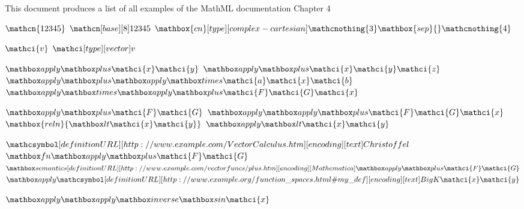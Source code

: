 \documentclass{article}
\begin{document}
This document produces a list of all examples of the MathML documentation
Chapter 4 

\newcommand\www{http://www.example.com}
\newcommand\openmath{http://www.openmath.org/cd}

\newcommand\Power[2]{\mmlapply{\mmlPower#1#2}}
\newcommand\Sum[2]{\mmlapply{\mmlPlus#1#2}}
\newcommand\Product[2]{\mmlapply{\mmlTimes#1#2}}
\newcommand\Lt[2]{\mmlapply{\mmlLt#1#2}}
\newcommand\Fn[1]{\mmlfn{\mathci{#1}}}
\newcommand\Set[1]{\mathci\mmlAtype{set}{#1}}
\newcommand\List[1]{\mathci\mmlAtype{list}{#1}}
\newcommand\Vector[1]{\mathci\mmlAtype{vector}{#1}}

\newcommand\exprA{\Sum{\mathci{F}}{\mathci{G}}}
\newcommand\Condition[1]{\mmlcondition{\mmlapply{#1}}}


\newcommand\cix{\mathci{x}}
\newcommand\ciy{\mathci{y}}
\newcommand\ciz{\mathci{z}}
\newcommand\cit{\mathci{t}}
\newcommand\ciu{\mathci{u}}

\newcommand\cia{\mathci{a}}
\newcommand\cib{\mathci{b}}
\newcommand\ciA{\mathci{A}}
\newcommand\ciB{\mathci{B}}
\newcommand\cic{\mathci{c}}
\newcommand\cif{\mathci{f}}
\newcommand\cin{\mathci{n}}
\newcommand\ciff{\mathci\mmlAtype{function}{f}} %
\newcommand\bvar[1]{\mmlbvar{\mathci{#1}}}
\newcommand\czero{\mathcn{0}}
\newcommand\cone{\mathcn{1}}
\newcommand\ctwo{\mathcn{2}}
\newcommand\cthree{\mathcn{3}}
\newcommand\cfour{\mathcn{4}}



$\mathcn{12345}$
$\mathcn\mmlAbase{8}{12345}$
$\mathbox{cn}\mmlAtype{complex-cartesian}
  {\mathcnothing{3}\mathbox{sep}{}\mathcnothing{4}}$

$\mathci{v}$
$\Vector{v}$


$\Sum\cix\ciy$
$\mmlapply{\mmlPlus\cix\ciy\ciz}$
$\mmlapply{\mmlPlus\Product{\cia}{\cix}\cib}$
$\mmlapply{\mmlTimes\exprA\cix}$


$\exprA$
$\mmlapply{\exprA\cix}$
$\mathbox{reln}{\mmlLt\cix\ciy}$
$\Lt{\cix}{\ciy}$

$\mathcsymbol\mmlAdefinitionURL{\www/VectorCalculus.htm}
 \mmlAencoding{text}{Christoffel}$
$\mmlfn{\exprA}$
$\mmlsemantics\mmlAdefinitionURL{\www/vectorfuncs/plus.htm}
   \mmlAencoding{Mathematica}{\exprA}$
$\mmlapply{
\mathcsymbol\mmlAdefinitionURL{http://www.example.org/function\_spaces.html\#my\_def}\mmlAencoding{text}{BigK}\cix\ciy}$

$\mmlapply{\mmlapply{\mmlInverse\mmlSin}\cix}$
\end{document}
